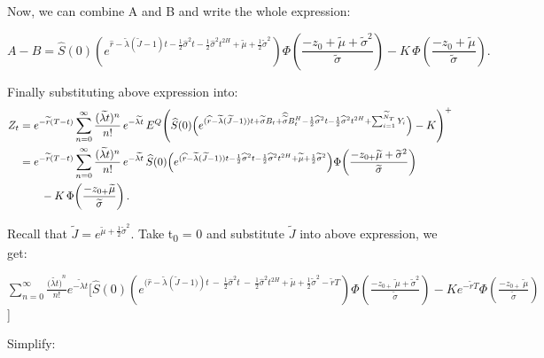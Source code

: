 \documentclass[12pt,a4paper]{report}
\numberwithin{equation}{section}
\begin{document}
Now, we can combine A and B and write the whole expression:

\[
A-B
= \widehat{S}(0)\left(
e^{\widehat{r}-\widetilde{\lambda}\left(\widetilde{J}-1\right)t
-\frac{1}{2}\widehat{\sigma}^{2}t
-\frac{1}{2}\widehat{\sigma}^{2}t^{2H}
+\widetilde{\mu}+\frac{1}{2}\widetilde{\sigma}^{2}}
\right)\Phi\!\left(\frac{-z_{0}+\widetilde{\mu}+\widetilde{\sigma}^{2}}{\widetilde{\sigma}}\right)
- K\,\Phi\!\left(\frac{-z_{0}+\widetilde{\mu}}{\widetilde{\sigma}}\right).
\]


Finally substituting above expression into:
\[
\begin{aligned}
Z_t
&= e^{-\widetilde{r}(T-t)}
\sum_{n=0}^{\infty}\frac{(\widetilde{\lambda t})^{n}}{n!}\,e^{-\widetilde{\lambda t}}\,
E^{Q}\!\left(\widehat{S}(0)\Bigl(e^{(\widehat{r}-\widetilde{\lambda}(\widetilde{J}-1))t
+\widetilde{\sigma}B_t+\widehat{\widetilde{\sigma}}B_t^{H}
-\frac{1}{2}\widehat{\sigma}^{2}t-\frac{1}{2}\widehat{\sigma}^{2}t^{2H}
+\sum_{i=1}^{\widetilde{N}_T}Y_i}\Bigr)-K\right)^{+} \\
&= e^{-\widetilde{r}(T-t)}
\sum_{n=0}^{\infty}\frac{(\widetilde{\lambda t})^{n}}{n!}\,e^{-\widetilde{\lambda t}}\,
\widehat{S}(0)\Bigl(e^{(\widehat{r}-\widetilde{\lambda}(\widetilde{J}-1))t
-\frac{1}{2}\widehat{\sigma}^{2}t-\frac{1}{2}\widehat{\sigma}^{2}t^{2H}
+\widetilde{\mu}+\frac{1}{2}\widetilde{\sigma}^{2}}\Bigr)
\Phi\!\left(\frac{-z_{0+}\widetilde{\mu}+\widetilde{\sigma}^{2}}{\widetilde{\sigma}}\right) \\
&\qquad - K\,\Phi\!\left(\frac{-z_{0+}\widetilde{\mu}}{\widetilde{\sigma}}\right).
\end{aligned}
\]



Recall that
\(\widetilde{J} = e^{\widetilde{\mu} + \frac{1}{2}{\widetilde{\sigma}}^{2}}\).
Take t\textsubscript{0} = 0 and substitute \(\widetilde{J}\) into above
expression, we get:

\(\sum_{n = 0}^{\infty}{\frac{({\widetilde{\lambda t})}^{n}}{n!}e^{\widetilde{- \lambda t}}\lbrack}\widehat{S}(0)\left( e^{(\widehat{r} - \widetilde{\lambda}\left( \widetilde{J} - 1) \right)t\  - \ \frac{1}{2}{\widehat{\sigma}}^{2}t\  - \ \frac{1}{2}{\widehat{\sigma}}^{2}t^{2H} + \widetilde{\mu} + \frac{1}{2}{\widetilde{\sigma}}^{2} - \widetilde{r}T} \right)\Phi\left( \frac{- z_{0 +}\widetilde{\ \mu} + {\widetilde{\sigma}}^{2}}{\widetilde{\sigma}} \right) - Ke^{- \widetilde{r}T}\Phi\left( \frac{- z_{0 +}\widetilde{\ \mu}}{\widetilde{\sigma}} \right)\){]}

Simplify:
\end{document}
